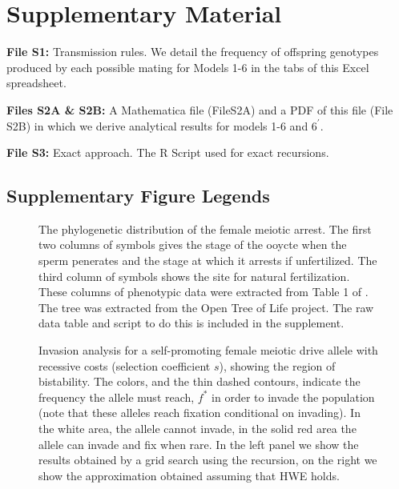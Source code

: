 \documentclass[12pt,letterpaper]{article}
\begin{document}
\clearpage
\newpage
  \setcounter{figure}{0}\global{}

\section*{Supplementary Material}

{\bf{File S1:}} Transmission rules. We detail the frequency of offspring genotypes produced by each possible mating for Models 1-6 in the tabs of this Excel spreadsheet. 


{\bf{Files S2A \& S2B:}} A Mathematica file (FileS2A) and a PDF of this file (File S2B) in which we derive analytical results for models 1-6 and $6^\prime$. 

{\bf{File S3:}} Exact approach. The R Script used for exact recursions.
\clearpage

\newpage
\subsection*{Supplementary Figure Legends}
\clearpage


\begin{figure}
\caption{The phylogenetic distribution of the female meiotic
  arrest. The first two columns of symbols gives the stage of the ooycte when
  the sperm penerates and the stage at which it arrests if
  unfertilized. The third column of symbols shows the site for natural fertilization. 
  These columns of phenotypic data were extracted from Table
  1 of \citet{Masui_book}. The tree was extracted from the Open Tree of
Life project. The raw data table and script to do this is included in
the supplement. }  
\label{Meiotic_fig}
\end{figure}


\begin{figure}
\caption{Invasion analysis for a self-promoting female meiotic drive allele with
  recessive costs (selection coefficient $s$), showing the region of
  bistability. The colors, and the thin dashed contours, indicate the
  frequency the allele must reach, $f^*$ in order to invade the population (note
  that these alleles reach fixation conditional on invading). In the
  white area, the allele cannot invade, in the solid red
  area the allele can invade and fix when rare. In the left panel we
  show the results obtained by a grid search using the recursion, on
  the right we show the approximation obtained assuming that HWE
  holds. }  
\label{Bistab_homozyg_cost_fig}
\end{figure}
\end{document}
